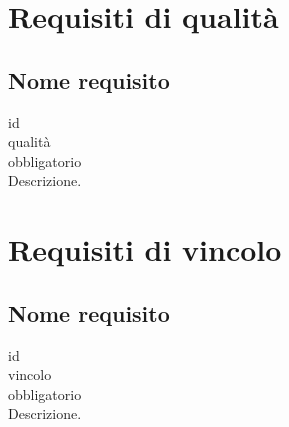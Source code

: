 \section{Requisiti di qualit\`a}

\subsection*{Nome requisito}
 id \\
 qualità \\
 obbligatorio \\
Descrizione.

\section{Requisiti di vincolo}

\subsection*{Nome requisito}
 id \\
 vincolo \\
 obbligatorio \\
Descrizione.


